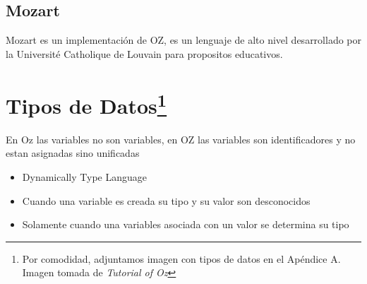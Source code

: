 \documentclass[10pt,journal,compsoc]{IEEEtran}
\begin{document}
\subsection{Mozart}
Mozart es un implementaci\'on de OZ, es un lenguaje de alto nivel desarrollado por la Universit\'e Catholique de Louvain para propositos educativos.

\section{Tipos de Datos\protect\footnote{Por comodidad, adjuntamos imagen con tipos de datos en el Ap\'endice A. Imagen tomada de \emph{Tutorial of Oz}}}
En Oz las variables no son variables, en OZ las variables son identificadores y no estan asignadas sino unificadas
\begin{itemize}
	\item Dynamically Type Language
	\item Cuando una variable es creada su tipo y su valor son desconocidos
	\item Solamente cuando una variables asociada con un valor se determina su tipo
\end{itemize}
\end{document}
